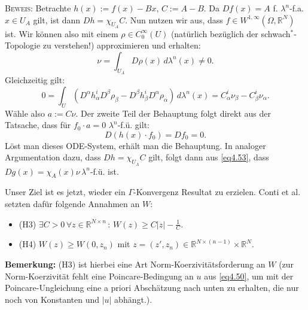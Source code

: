 \textsc{Beweis:} Betrachte \(h(x) := f(x) - Bx, \, C := A - B\). Da \(Df(x) = A\) f. \(\lambda^n\)-f.a. \(x \in U_A\) gilt, ist dann \(Dh = \chi_{U_A} C\). Nun nutzen wir aus, dass \(f \in W^{1,\infty}(\Omega,\mathbb{R}^N)\) ist. Wir können also mit einem \(\rho \in C^{\infty}_0(U)\) (natürlich bezüglich der schwach\(^*\)-Topologie zu verstehen!) approximieren und erhalten:
\begin{equation}
    \nu = \int_{U_A} D\rho(x) \,d\lambda^n(x) \neq 0.
\end{equation}
Gleichzeitig gilt:
\begin{equation}
    0 = \int_{U} (D^{\alpha}h^i_{\alpha}D^{\beta}\rho_{\beta} - D^{\beta}h^i_{\beta}D^{\alpha}\rho_{\alpha}) \,d\lambda^n(x) = C^i_{\alpha}\nu_{\beta} - C^i_{\beta}\nu_{\alpha}.
\end{equation}
Wähle also \(a := C\nu\). Der zweite Teil der Behauptung folgt direkt aus der Tatsache, dass für \(f_0 \cdot a = 0\) \(\lambda^n\)-f.ü. gilt:
\begin{equation}
    D(h(x) \cdot f_0) = Df_0 = 0.
\end{equation}
Löst man dieses ODE-System, erhält man die Behauptung. In analoger Argumentation dazu, dass \(Dh = \chi_{U_A} C\) gilt, folgt dann aus \eqref{eq4.53}, dass \(Dg(x) = \chi_A(x)\nu \, \lambda^n\)-f.ü. ist. \QEDB

Unser Ziel ist es jetzt, wieder ein \(\Gamma\)-Konvergenz Resultat zu erzielen. Conti et al. \\setzten dafür folgende Annahmen an \(W\):
\begin{itemize}
    \item (H3) \(\exists C > 0 \, \forall z \in \mathbb{R}^{N \times n} \, : \, W(z) \geq C |z| - \frac{1}{C}\).
    \item (H4) \(W(z) \geq W(0,z_n)\) mit \(z = (z',z_n) \in \mathbb{R}^{N \times (n-1)} \times \mathbb{R}^N\).
\end{itemize}

\textbf{Bemerkung:} (H3) ist hierbei eine Art Norm-Koerzivitätsforderung an \(W\) (zur Norm-Koerzivität fehlt eine Poincare-Bedingung an \(u\) aus \eqref{eq4.50}, um mit der Poincare-Ungleichung eine a priori Abschätzung nach unten zu erhalten, die nur noch von Konstanten und \(|u|\) abhängt.).\\

